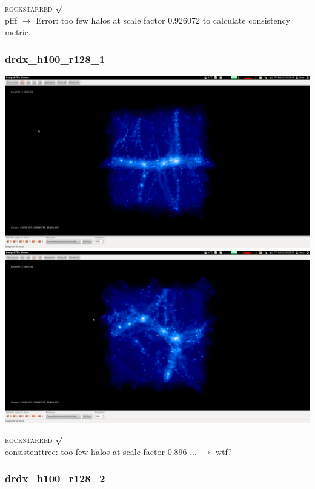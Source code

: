 \documentclass[a4paper,11pt,fleqn,oneside]{book}
\begin{document}
\textsc{rockstarred} $\surd$  \\
pfff $\rightarrow$ Error: too few halos at scale factor 0.926072 to calculate consistency metric.

\newpage
\subsubsection{drdx\_h100\_r128\_1}

\includegraphics[scale=0.12]{drdx_h100_r128_1/1.png} 
\includegraphics[scale=0.12]{drdx_h100_r128_1/2.png} 

\textsc{rockstarred} $\surd$  \\
consistenttree: too few halos at scale factor 0.896 ... $\rightarrow$ wtf? 

\newpage
\subsubsection{drdx\_h100\_r128\_2}
\end{document}

